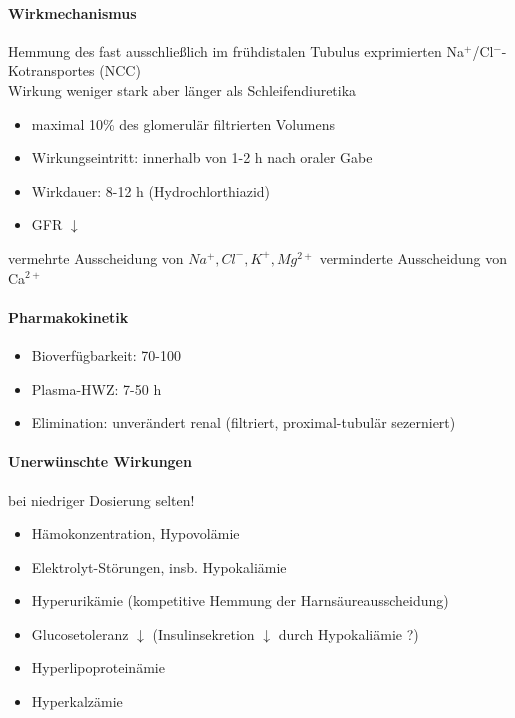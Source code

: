 \documentclass[10pt,a4paper]{report}
\begin{document}
\paragraph{Wirkmechanismus}
Hemmung des fast ausschließlich im frühdistalen Tubulus exprimierten Na$^+$/Cl$^-$-Kotransportes (NCC)\\
Wirkung weniger stark aber länger als Schleifendiuretika\\
\begin{itemize}
	\item maximal 10\% des glomerulär 	filtrierten  Volumens
	\item Wirkungseintritt: innerhalb von 1-2 h nach oraler Gabe
	\item Wirkdauer: 8-12 h (Hydrochlorthiazid) 
	\item GFR $\downarrow$ 
\end{itemize}
vermehrte Ausscheidung von $Na^+, Cl^-, K^+, Mg^{2+}$ verminderte Ausscheidung von Ca$^{2+}$
\paragraph{Pharmakokinetik}
\begin{itemize}
	\item Bioverfügbarkeit: 70-100 %
	\item Plasma-HWZ: 7-50 h
	\item Elimination: unverändert renal (filtriert, proximal-tubulär sezerniert)
\end{itemize}
\paragraph{Unerwünschte Wirkungen}
bei niedriger Dosierung selten!
\begin{itemize}
	\item Hämokonzentration, Hypovolämie
	\item Elektrolyt-Störungen, insb. Hypokaliämie
	\item Hyperurikämie (kompetitive Hemmung der Harnsäureausscheidung)
	\item Glucosetoleranz $\downarrow$ (Insulinsekretion $\downarrow$ durch Hypokaliämie ?)
	\item Hyperlipoproteinämie
	\item Hyperkalzämie
\end{itemize}
\end{document}
